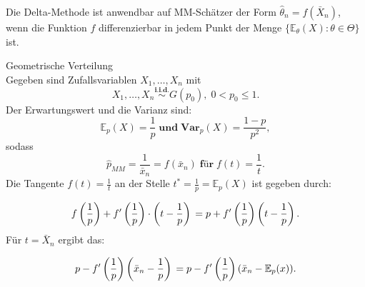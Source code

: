 \documentclass[10pt]{article}
\newcommand{\FZV}{X_1, \ldots, X_n} %
\newcommand{\EW}{\mathbb{E}} %
\newenvironment{BSP}[1][]
{\begin{Beispiel}[frametitle=#1]}{\end{Beispiel}}
\begin{document}
	\noindent Die Delta-Methode ist anwendbar auf MM-Schätzer der Form $\hat{\theta}_n = f(\bar{X}_n)$, wenn die Funktion $f$ differenzierbar in jedem Punkt der Menge $\{\EW_\theta(X) : \theta \in \Theta\}$ ist.
	
		\begin{BSP}[Beispiel 1.3.5 (Delta-Methode)]
		
		Geometrische Verteilung \\
		Gegeben sind Zufallsvariablen $\FZV$ mit
		\begin{equation*}
			\FZV \overset{\textbf{i.i.d.}}{\sim} G(p_0), \; 0 < p_0 \leq 1.
		\end{equation*} 
		Der Erwartungswert und die Varianz sind:
		\begin{equation*}
			\EW_p(X) = \frac{1}{p} \; \textbf{und} \;  \textbf{Var}_p(X) = \frac{1-p}{p^2},
		\end{equation*}
		sodass
		\begin{equation*}
			\hat{p}_{MM} = \frac{1}{\bar{x}_n} = f(\bar{x}_n) \; \textbf{für} \; f(t)= \frac{1}{t}.
		\end{equation*} 
		Die Tangente $f(t) = \frac{1}{t}$ an der Stelle $t^* = \frac{1}{p} = \EW_p(X)$ ist gegeben durch:
		
		\begin{equation*}
			f\left(\frac{1}{p}\right) + f'\left(\frac{1}{p}\right) \cdot \left(t-\frac{1}{p}\right)\\
			= p + f'\left(\frac{1}{p}\right) \left(t-\frac{1}{p}\right).
		\end{equation*}
		Für $t=\bar{X}_n$ ergibt das:
		
		\begin{equation*}
			p - f'\left(\frac{1}{p}\right) \left(\bar{x}_n - \frac{1}{p}\right) \\
			= p - f'\left(\frac{1}{p}\right) (\bar{x}_n - \EW_p(x)).
		\end{equation*}
		
	\end{BSP}
	
\end{document}
